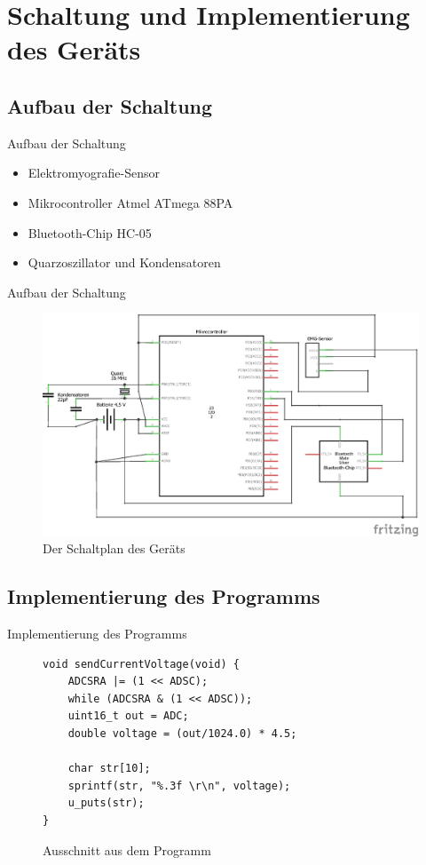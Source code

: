 \documentclass[hyphens]{beamer}
\begin{document}
\section{Schaltung und Implementierung des Geräts}

\subsection{Aufbau der Schaltung}

\begin{frame}{Aufbau der Schaltung}
	\begin{itemize}
		\item Elektromyografie-Sensor
		\item Mikrocontroller Atmel ATmega 88PA
		\item Bluetooth-Chip HC-05
		\item Quarzoszillator und Kondensatoren
	\end{itemize}
\end{frame}

\begin{frame}{Aufbau der Schaltung}
\begin{figure}
	\includegraphics[scale=0.7]{pics/mikrocontroller-schaltplan}
	\caption{Der Schaltplan des Geräts}
\end{figure}
\end{frame}

\subsection{Implementierung des Programms}

\begin{frame}[fragile]{Implementierung des Programms}
	\begin{figure}
	\begin{verbatim}
void sendCurrentVoltage(void) {
	ADCSRA |= (1 << ADSC);
	while (ADCSRA & (1 << ADSC));
	uint16_t out = ADC;
	double voltage = (out/1024.0) * 4.5;
	
	char str[10];
	sprintf(str, "%.3f \r\n", voltage);
	u_puts(str);
}
	\end{verbatim}
	\centering \caption{Ausschnitt aus dem Programm}
\end{figure}
\end{frame}
\end{document}
